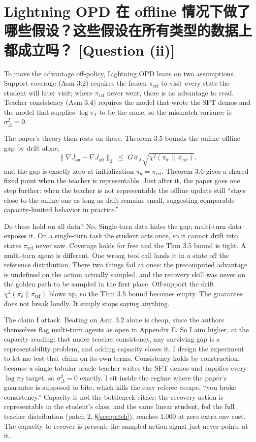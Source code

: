 \documentclass[11pt]{article}
\newcommand{\qtag}[1]{\hfill{\normalfont\small\color{gray}[Question (#1)]}}
\begin{document}
\section{Lightning OPD 在 offline 情况下做了哪些假设？这些假设在所有类型的数据上都成立吗？ \qtag{ii}}
\label{sec:assumptions}

To move the advantage off-policy, Lightning OPD leans on two assumptions. Support
coverage (Asm 3.2) requires the frozen $\pi_{\mathrm{ref}}$ to visit every state the
student will later visit; where $\pi_{\mathrm{ref}}$ never went, there is no advantage
to read. Teacher consistency (Asm 3.4) requires the model that wrote the SFT demos and
the model that supplies $\log\pi_T$ to be the same, so the mismatch variance is
$\sigma_\Delta^2 = 0$.

The paper's theory then rests on these. Theorem 3.5 bounds the
online--offline gap by drift alone,
\[
\bigl\|\nabla J_{\mathrm{on}} - \nabla J_{\mathrm{off}}\bigr\|_2
\;\le\; G\,\sigma_A \sqrt{\chi^2(\pi_\theta \,\|\, \pi_{\mathrm{ref}})},
\]
and the gap is exactly zero at initialization $\pi_\theta=\pi_{\mathrm{ref}}$.
Theorem 3.6 gives a shared fixed point when the teacher is representable.
Just after it, the paper goes one step further: when the teacher is not
representable the offline update still ``stays close to the online one as long as
drift remains small, suggesting comparable capacity-limited behavior in practice.''

Do these hold on all data? No. Single-turn data hides the gap; multi-turn
data exposes it. On a single-turn task the student acts once, so it cannot drift
into states $\pi_{\mathrm{ref}}$ never saw. Coverage holds for free and the Thm 3.5
bound is tight. A multi-turn agent is different. One wrong tool call lands it in a
state off the reference distribution. There two things fail at once: the
precomputed advantage is undefined on the action actually sampled, and the
recovery skill was never on the golden path to be sampled in the first place.
Off-support the drift $\chi^2(\pi_\theta\|\pi_{\mathrm{ref}})$ blows up, so the
Thm 3.5 bound becomes empty. The guarantee does not break loudly. It simply stops
saying anything.

The claim I attack. Beating on Asm 3.2 alone is cheap, since the authors
themselves flag multi-turn agents as open in Appendix E. So I aim higher, at the
capacity reading: that under teacher consistency, any surviving gap is a
representability problem, and adding capacity closes it. I design the experiment
to let me test that claim on its own terms. Consistency holds by construction,
because a single tabular oracle teacher writes the SFT demos and supplies every
$\log\pi_T$ target, so $\sigma_\Delta^2 = 0$ exactly. I sit inside the regime where
the paper's guarantee is supposed to bite, which kills the easy referee escape,
``you broke consistency.'' Capacity is not the bottleneck either: the recovery action
is representable in the student's class, and the same linear student, fed the full
teacher distribution (patch 2, \S\ref{sec:patch}), reaches 1.000 at zero extra
env cost. The capacity to recover is present; the sampled-action signal just
never points at it.
\end{document}
